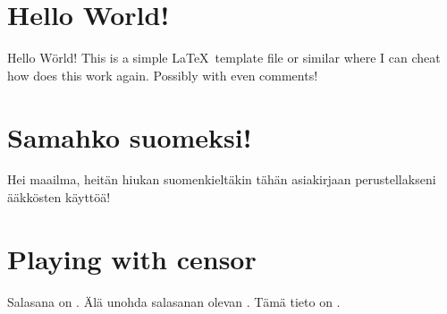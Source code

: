 \documentclass[a4paper,12pt]{artikel3}
\begin{document}
\section*{Hello World!}

Hello Wörld! This is a simple \LaTeX\ template file or similar where I can
cheat how does this work again. Possibly with even comments!

\section*{Samahko suomeksi!}

Hei maailma, heitän hiukan suomenkieltäkin tähän asiakirjaan perustellakseni
ääkkösten käyttöä!

\section*{Playing with censor}


\def \Password{}
\def \Huippusalainen{\censor*{14}}

Salasana on \Password. Älä unohda salasanan olevan \Password. Tämä tieto on \Huippusalainen.

\end{document}
